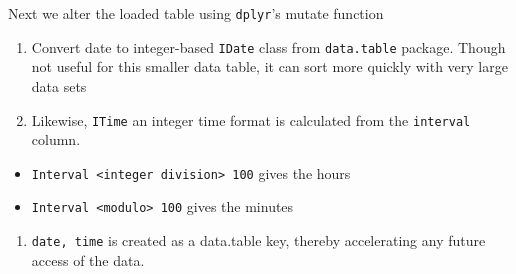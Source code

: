 \documentclass[]{article}
\newenvironment{Shaded}{\begin{snugshade}}{\end{snugshade}}
\newcommand{\KeywordTok}[1]{\textcolor[rgb]{0.13,0.29,0.53}{\textbf{{#1}}}}
\newcommand{\DataTypeTok}[1]{\textcolor[rgb]{0.13,0.29,0.53}{{#1}}}
\newcommand{\StringTok}[1]{\textcolor[rgb]{0.31,0.60,0.02}{{#1}}}
\newcommand{\OtherTok}[1]{\textcolor[rgb]{0.56,0.35,0.01}{{#1}}}
\newcommand{\NormalTok}[1]{{#1}}
\begin{document}
\begin{Shaded}
\end{Shaded}

Next we alter the loaded table using \texttt{dplyr}'s mutate function

\begin{enumerate}
\def\labelenumi{\arabic{enumi}.}
\itemsep1pt\parskip0pt
\item
  Convert date to integer-based \texttt{IDate} class from
  \texttt{data.table} package. Though not useful for this smaller data
  table, it can sort more quickly with very large data sets
\item
  Likewise, \texttt{ITime} an integer time format is calculated from the
  \texttt{interval} column.
\end{enumerate}

\begin{itemize}
\itemsep1pt\parskip0pt
\item
  \texttt{Interval \textless{}integer division\textgreater{} 100} gives
  the hours
\item
  \texttt{Interval \textless{}modulo\textgreater{} 100} gives the
  minutes
\end{itemize}

\begin{enumerate}
\def\labelenumi{\arabic{enumi}.}
\setcounter{enumi}{2}
\itemsep1pt\parskip0pt
\item
  \texttt{date, time} is created as a data.table key, thereby
  accelerating any future access of the data.
\end{enumerate}
\end{document}
